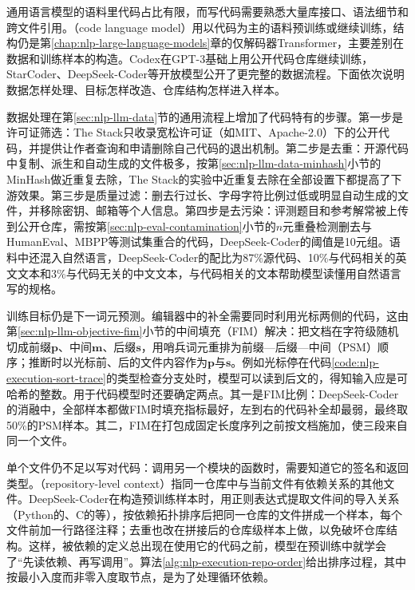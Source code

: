 通用语言模型的语料里代码占比有限，而写代码需要熟悉大量库接口、语法细节和跨文件引用。（code language model）用以代码为主的语料预训练或继续训练，结构仍是第\ref{chap:nlp-large-language-models}章的仅解码器Transformer，主要差别在数据和训练样本的构造。Codex在GPT-3基础上用公开代码仓库继续训练\cite{nlp-intro-chen2021}，StarCoder、DeepSeek-Coder等开放模型公开了更完整的数据流程\cite{nlp-execution-li2023starcoder,nlp-execution-guo2024deepseekcoder}。下面依次说明数据怎样处理、目标怎样改造、仓库结构怎样进入样本。

数据处理在第\ref{sec:nlp-llm-data}节的通用流程上增加了代码特有的步骤。第一步是许可证筛选：The Stack只收录宽松许可证（如MIT、Apache-2.0）下的公开代码，并提供让作者查询和申请删除自己代码的退出机制。第二步是去重：开源代码中复制、派生和自动生成的文件极多，按第\ref{sec:nlp-llm-data-minhash}小节的MinHash做近重复去除，The Stack的实验中近重复去除在全部设置下都提高了下游效果。第三步是质量过滤：删去行过长、字母字符比例过低或明显自动生成的文件，并移除密钥、邮箱等个人信息。第四步是去污染：评测题目和参考解常被上传到公开仓库，需按第\ref{sec:nlp-eval-contamination}小节的$n$元重叠检测删去与HumanEval、MBPP等测试集重合的代码，DeepSeek-Coder的阈值是10元组。语料中还混入自然语言，DeepSeek-Coder的配比为87\%源代码、10\%与代码相关的英文文本和3\%与代码无关的中文文本，与代码相关的文本帮助模型读懂用自然语言写的规格。

训练目标仍是下一词元预测。编辑器中的补全需要同时利用光标两侧的代码，这由第\ref{sec:nlp-llm-objective-fim}小节的中间填充（FIM）解决：把文档在字符级随机切成前缀$\bm p$、中间$\bm m$、后缀$\bm s$，用哨兵词元重排为前缀—后缀—中间（PSM）顺序；推断时以光标前、后的文件内容作为$\bm p$与$\bm s$。例如光标停在代码\ref{code:nlp-execution-sort-trace}的类型检查分支处时，模型可以读到后文的，得知输入应是可哈希的整数。用于代码模型时还要确定两点。其一是FIM比例：DeepSeek-Coder的消融中，全部样本都做FIM时填充指标最好，左到右的代码补全却最弱，最终取50\%的PSM样本。其二，FIM在打包成固定长度序列之前按文档施加，使三段来自同一个文件。

单个文件仍不足以写对代码：调用另一个模块的函数时，需要知道它的签名和返回类型。（repository-level context）指同一仓库中与当前文件有依赖关系的其他文件。DeepSeek-Coder在构造预训练样本时，用正则表达式提取文件间的导入关系（Python的、C的等），按依赖拓扑排序后把同一仓库的文件拼成一个样本，每个文件前加一行路径注释；去重也改在拼接后的仓库级样本上做，以免破坏仓库结构。这样，被依赖的定义总出现在使用它的代码之前，模型在预训练中就学会了“先读依赖、再写调用”。算法\ref{alg:nlp-execution-repo-order}给出排序过程，其中按最小入度而非零入度取节点，是为了处理循环依赖。

